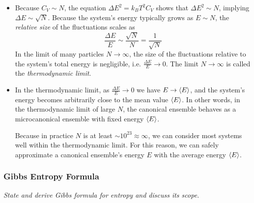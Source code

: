 \documentclass[11pt, a4paper]{article}
\begin{document}
\begin{itemize}
	\item Because $ C_{V} \sim N $, the equation $ \Delta E^{2} = k_{B}T^{2} C_{V} $ shows that $ \Delta E^{2} \sim N $, implying $ \Delta E \sim \sqrt{N} $. Because the system's energy typically grows as $ E \sim N $, the \textit{relative size} of the fluctuations scales as
	\begin{equation*}
		\frac{\Delta E}{E} \sim \frac{\sqrt{N}}{N} = \frac{1}{\sqrt{N}}
	\end{equation*}
	In the limit of many particles $ N \to \infty $, the size of the fluctuations relative to the system's total energy is negligible, i.e. $ \frac{\Delta E}{E} \to 0 $. The limit $ N \to \infty $ is called the \textit{thermodynamic limit}.
	
	\item In the thermodynamic limit, as $ \frac{\Delta E}{E} \to 0 $ we have $ E \to \expval{E} $, and the system's energy becomes arbitrarily close to the mean value $ \expval{E} $. In other words, in the thermodynamic limit of large $ N $, the canonical ensemble behaves as a microcanonical ensemble with fixed energy $ \expval{E} $.
	
	Because in practice $ N $ is at least $ \sim 10^{23} \approx \infty$, we can consider most systems well within the thermodynamic limit. For this reason, we can safely approximate a canonical ensemble's energy $ E $ with the average energy $ \expval{E} $.

\end{itemize}

\subsubsection{Gibbs Entropy Formula}
\textit{State and derive Gibbs formula for entropy and discuss its scope.}
\end{document}
